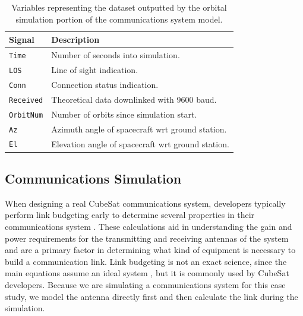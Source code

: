 \documentclass[conf]{new-aiaa}
\begin{document}
\vspace{15 mm}

\begin{table}[!h]
\centering
\begin{tabular}{ll} 
\hline\hline
\textbf{Signal} & \textbf{Description}                               \\ 
\hline
\texttt{Time}            & Number of seconds into simulation.                 \\
\texttt{LOS}             & Line of sight indication.                          \\
\texttt{Conn}            & Connection status indication.                      \\
\texttt{Received}        & Theoretical data downlinked with 9600 baud.        \\
\texttt{OrbitNum}        & Number of orbits since simulation start.           \\
\texttt{Az}              & Azimuth angle of spacecraft wrt ground station.    \\
\texttt{El}              & Elevation angle of spacecraft wrt ground station.  \\
\hline\hline
\end{tabular}
\caption{Variables representing the dataset outputted by the orbital simulation portion of the communications system model.}
\label{GroundStationVariables}
\end{table}

\subsection{Communications Simulation}

When designing a real CubeSat communications system, developers typically perform link budgeting early to determine several properties in their communications system \cite{daylee2018}. These calculations aid in understanding the gain and power requirements for the transmitting and receiving antennas of the system and are a primary factor in determining what kind of equipment is necessary to build a communication link. Link budgeting is not an exact science, since the main equations assume an ideal system \cite{Zyren1998}, but it is commonly used by CubeSat developers. Because we are simulating a communications system for this case study, we model the antenna directly first and then calculate the link during the simulation.
\end{document}
